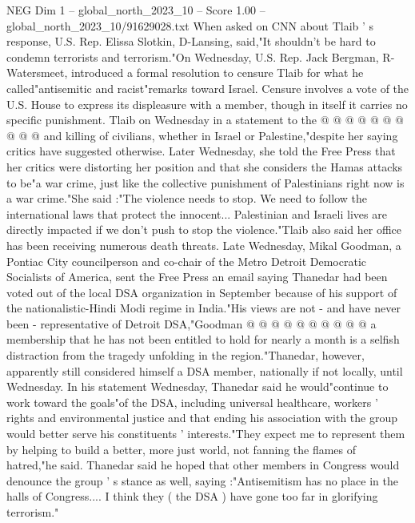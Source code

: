 \begin{textsample}{NEG Dim 1 – global\_north\_2023\_10 – Score 1.00 – global\_north\_2023\_10/91629028.txt}
When asked on CNN about Tlaib ' s response, U.S.
Rep.
Elissa Slotkin, D-Lansing, said,"It shouldn't be hard to condemn terrorists and terrorism."On Wednesday, U.S.
Rep.
Jack Bergman, R-Watersmeet, introduced a formal resolution to censure Tlaib for what he called"antisemitic and racist"remarks toward Israel.
Censure involves a vote of the U.S.
House to express its displeasure with a member, though in itself it carries no specific punishment.
Tlaib on Wednesday in a statement to the @ @ @ @ @ @ @ @ @ @ and killing of civilians, whether in Israel or Palestine,"despite her saying critics have suggested otherwise.
Later Wednesday, she told the Free Press that her critics were distorting her position and that she considers the Hamas attacks to be"a war crime, just like the collective punishment of Palestinians right now is a war crime."She said :"The violence needs to stop.
We need to follow the international laws that protect the innocent...
Palestinian and Israeli lives are directly impacted if we don't push to stop the violence."Tlaib also said her office has been receiving numerous death threats.
Late Wednesday, Mikal Goodman, a Pontiac City councilperson and co-chair of the Metro Detroit Democratic Socialists of America, sent the Free Press an email saying Thanedar had been voted out of the local DSA organization in September because of his support of the nationalistic-Hindi Modi regime in India."His views are not - and have never been - representative of Detroit DSA,"Goodman @ @ @ @ @ @ @ @ @ @ a membership that he has not been entitled to hold for nearly a month is a selfish distraction from the tragedy unfolding in the region."Thanedar, however, apparently still considered himself a DSA member, nationally if not locally, until Wednesday.
In his statement Wednesday, Thanedar said he would"continue to work toward the goals"of the DSA, including universal healthcare, workers ' rights and environmental justice and that ending his association with the group would better serve his constituents ' interests."They expect me to represent them by helping to build a better, more just world, not fanning the flames of hatred,"he said.
Thanedar said he hoped that other members in Congress would denounce the group ' s stance as well, saying :"Antisemitism has no place in the halls of Congress....
I think they ( the DSA ) have gone too far in glorifying terrorism."

\end{textsample}
